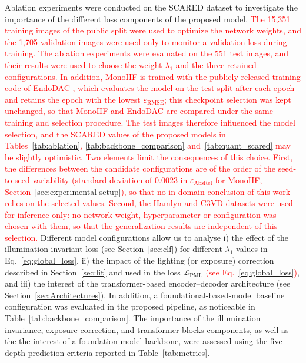 \documentclass[a4paper,fleqn]{cas-dc}
\begin{document}
Ablation experiments were conducted on the SCARED dataset to investigate the importance of the different loss components of the proposed model. \textcolor{red}{The 15,351 training images of the public split were used to optimize the network weights, and the 1,705 validation images were used only to monitor a validation loss during training. The ablation experiments were evaluated on the 551 test images, and their results were used to choose the weight $\lambda_1$ and the three retained configurations. In addition, MonoIIF is trained with the publicly released training code of EndoDAC \citep{EndoDAC_MICCAI_2024}, which evaluates the model on the test split after each epoch and retains the epoch with the lowest $\varepsilon_\textrm{RMSE}$; this checkpoint selection was kept unchanged, so that MonoIIF and EndoDAC are compared under the same training and selection procedure. The test images therefore influenced the model selection, and the SCARED values of the proposed models in Tables~\ref{tab:ablation}, \ref{tab:backbone_comparison} and~\ref{tab:quant_scared} may be slightly optimistic. Two elements limit the consequences of this choice. First, the differences between the candidate configurations are of the order of the seed-to-seed variability (standard deviation of $0.0023$ in $\varepsilon_\textrm{AbsRel}$ for MonoIIF, Section~\ref{sec:experimental-setup}), so that no in-domain conclusion of this work relies on the selected values. Second, the Hamlyn and C3VD datasets were used for inference only: no network weight, hyperparameter or configuration was chosen with them, so that the generalization results are independent of this selection.} Different model configurations allow us to analyse i) the effect of the illumination-invariant loss (see Section~\ref{sec:clf}) for different $\lambda_1$ values in Eq.~\eqref{eq:global_loss}, ii) the impact of the lighting (or exposure) correction described in Section~\ref{sec:lit} and used in the loss $\mathcal{L}_\textrm{PML}$ \textcolor{red}{(see Eq.~\eqref{eq:global_loss})}, and iii) the interest of the transformer-based encoder–decoder architecture (see Section~\ref{sec:Architectures}). In addition, a foundational-based-model baseline configuration was evaluated in the proposed pipeline, as noticeable in Table~\ref{tab:backbone_comparison}. The importance of the illumination invariance, exposure correction, and transformer blocks components, as well as the the interest of a foundation model backbone, were assessed using the five depth-prediction criteria reported in Table~\ref{tab:metrics}.
 
\end{document}
